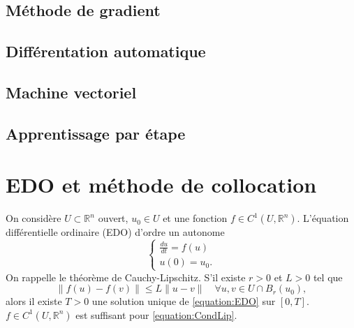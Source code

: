 \documentclass[11pt,a4paper]{article}
\newcommand{\R}{\mathbb R}
\newcommand{\norm}[1]{\|#1\|}
\begin{document}
\subsection{Méthode de gradient}\label{subsec:}
%
%
\subsection{Différentation automatique}\label{subsec:}
%
%
\subsection{Machine vectoriel}\label{subsec:}
%
%
\subsection{Apprentissage par étape}\label{subsec:}
%
%
%
\section{EDO et méthode de collocation}\label{sec:}
%
On considère $U\subset \R^n$ ouvert, $u_0\in U$ et une fonction $f\in C^1(U,\R^n)$. L'équation différentielle ordinaire (EDO) d'ordre un autonome
%
\begin{equation}\label{equation:EDO}
\left\{
\begin{aligned}
\frac{du}{dt} = f(u)\\
u(0) = u_0.
\end{aligned}
\right.
\end{equation}
%
On rappelle le théorème de Cauchy-Lipschitz. S'il existe $r>0$ et $L>0$ tel que
%
\begin{equation}\label{equation:CondLip}
\norm{f(u)-f(v)}\le L\norm{u-v}\quad \forall u,v\in U\cap B_r(u_0),
\end{equation}
%
alors il existe $T>0$ une solution unique de \eqref{equation:EDO} sur $[0,T]$. $f\in C^1(U,\R^n)$ est suffisant pour \eqref{equation:CondLip}.
%
\end{document}
